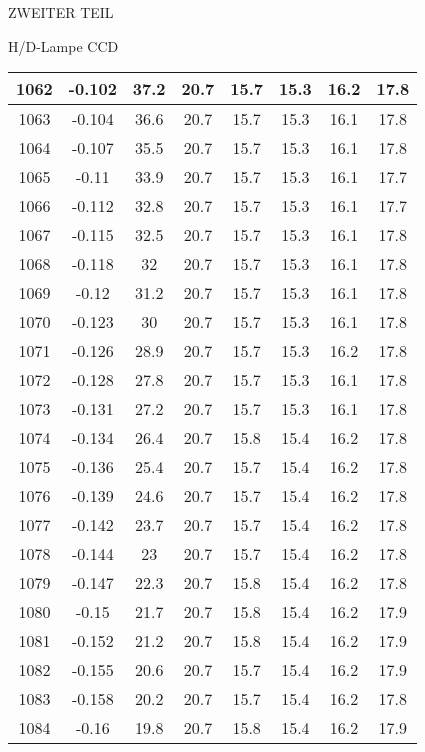 \begin{appendix}
\begin{chapter}{ZWEITER TEIL}
\begin{section}{H/D-Lampe CCD}
\begin{scriptsize}
\begin{longtable}[htbp]{|c|c|c|c|c|c|c|c|}
            1062 & -0.102 & 37.2 & 20.7 & 15.7 & 15.3 & 16.2 & 17.8 \\ \hline
            1063 & -0.104 & 36.6 & 20.7 & 15.7 & 15.3 & 16.1 & 17.8 \\ \hline
            1064 & -0.107 & 35.5 & 20.7 & 15.7 & 15.3 & 16.1 & 17.8 \\ \hline
            1065 & -0.11 & 33.9 & 20.7 & 15.7 & 15.3 & 16.1 & 17.7 \\ \hline
            1066 & -0.112 & 32.8 & 20.7 & 15.7 & 15.3 & 16.1 & 17.7 \\ \hline
            1067 & -0.115 & 32.5 & 20.7 & 15.7 & 15.3 & 16.1 & 17.8 \\ \hline
            1068 & -0.118 & 32 & 20.7 & 15.7 & 15.3 & 16.1 & 17.8 \\ \hline
            1069 & -0.12 & 31.2 & 20.7 & 15.7 & 15.3 & 16.1 & 17.8 \\ \hline
            1070 & -0.123 & 30 & 20.7 & 15.7 & 15.3 & 16.1 & 17.8 \\ \hline
            1071 & -0.126 & 28.9 & 20.7 & 15.7 & 15.3 & 16.2 & 17.8 \\ \hline
            1072 & -0.128 & 27.8 & 20.7 & 15.7 & 15.3 & 16.1 & 17.8 \\ \hline
            1073 & -0.131 & 27.2 & 20.7 & 15.7 & 15.3 & 16.1 & 17.8 \\ \hline
            1074 & -0.134 & 26.4 & 20.7 & 15.8 & 15.4 & 16.2 & 17.8 \\ \hline
            1075 & -0.136 & 25.4 & 20.7 & 15.7 & 15.4 & 16.2 & 17.8 \\ \hline
            1076 & -0.139 & 24.6 & 20.7 & 15.7 & 15.4 & 16.2 & 17.8 \\ \hline
            1077 & -0.142 & 23.7 & 20.7 & 15.7 & 15.4 & 16.2 & 17.8 \\ \hline
            1078 & -0.144 & 23 & 20.7 & 15.7 & 15.4 & 16.2 & 17.8 \\ \hline
            1079 & -0.147 & 22.3 & 20.7 & 15.8 & 15.4 & 16.2 & 17.8 \\ \hline
            1080 & -0.15 & 21.7 & 20.7 & 15.8 & 15.4 & 16.2 & 17.9 \\ \hline
            1081 & -0.152 & 21.2 & 20.7 & 15.8 & 15.4 & 16.2 & 17.9 \\ \hline
            1082 & -0.155 & 20.6 & 20.7 & 15.7 & 15.4 & 16.2 & 17.9 \\ \hline
            1083 & -0.158 & 20.2 & 20.7 & 15.7 & 15.4 & 16.2 & 17.8 \\ \hline
            1084 & -0.16 & 19.8 & 20.7 & 15.8 & 15.4 & 16.2 & 17.9 \\ \hline

\end{longtable}
\end{scriptsize}
\end{section}
\end{chapter}
\end{appendix}

